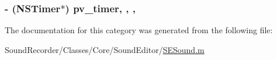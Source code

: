 \hypertarget{category_s_e_sound_07_08_a442a4628a62297b4978869a0c762e8db}{
\subsubsection[{pv\-\_\-timer}]{\setlength{\rightskip}{0pt plus 5cm}-\/ (N\-S\-Timer$\ast$) pv\-\_\-timer\hspace{0.3cm}{\ttfamily [read]}, {\ttfamily [write]}, {\ttfamily [nonatomic]}, {\ttfamily [strong]}}}\label{category_s_e_sound_07_08_a442a4628a62297b4978869a0c762e8db}


The documentation for this category was generated from the following file\-:\begin{DoxyCompactItemize}
\item 
Sound\-Recorder/\-Classes/\-Core/\-Sound\-Editor/\hyperlink{_s_e_sound_8m}{S\-E\-Sound.\-m}\end{DoxyCompactItemize}
